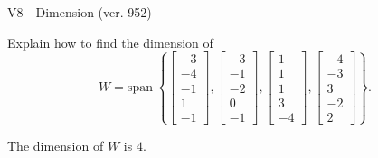 \begin{exercise}
  \begin{exerciseTitle}V8 - Dimension (ver. 952)\end{exerciseTitle}
  \begin{exerciseStatement}
    Explain how to find the dimension of 
\[W=\mathrm{span}\ \left\{\left[\begin{array}{r}
-3 \\
-4 \\
-1 \\
1 \\
-1
\end{array}\right] , \left[\begin{array}{r}
-3 \\
-1 \\
-2 \\
0 \\
-1
\end{array}\right] , \left[\begin{array}{r}
1 \\
1 \\
1 \\
3 \\
-4
\end{array}\right] , \left[\begin{array}{r}
-4 \\
-3 \\
3 \\
-2 \\
2
\end{array}\right]\right\}.\]



  \end{exerciseStatement}
  \begin{exerciseAnswer}
   The dimension of \(W\) is  \(4\).
  


  \end{exerciseAnswer}
\end{exercise}